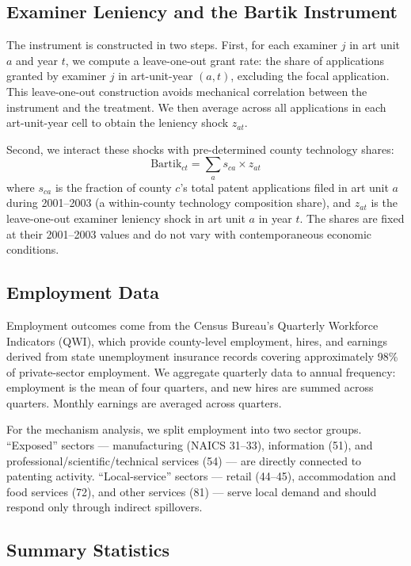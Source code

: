 \documentclass[12pt]{article}
\begin{document}
\subsection{Examiner Leniency and the Bartik Instrument}

The instrument is constructed in two steps. First, for each examiner $j$ in art unit $a$ and year $t$, we compute a leave-one-out grant rate: the share of applications granted by examiner $j$ in art-unit-year $(a,t)$, excluding the focal application. This leave-one-out construction avoids mechanical correlation between the instrument and the treatment. We then average across all applications in each art-unit-year cell to obtain the leniency shock $z_{at}$.

Second, we interact these shocks with pre-determined county technology shares:
\begin{equation}
\text{Bartik}_{ct} = \sum_{a} s_{ca} \times z_{at}
\label{eq:bartik}
\end{equation}
where $s_{ca}$ is the fraction of county $c$'s total patent applications filed in art unit $a$ during 2001--2003 (a within-county technology composition share), and $z_{at}$ is the leave-one-out examiner leniency shock in art unit $a$ in year $t$. The shares are fixed at their 2001--2003 values and do not vary with contemporaneous economic conditions.

\subsection{Employment Data}

Employment outcomes come from the Census Bureau's Quarterly Workforce Indicators (QWI), which provide county-level employment, hires, and earnings derived from state unemployment insurance records covering approximately 98\% of private-sector employment. We aggregate quarterly data to annual frequency: employment is the mean of four quarters, and new hires are summed across quarters. Monthly earnings are averaged across quarters.

For the mechanism analysis, we split employment into two sector groups. ``Exposed'' sectors --- manufacturing (NAICS 31--33), information (51), and professional/scientific/technical services (54) --- are directly connected to patenting activity. ``Local-service'' sectors --- retail (44--45), accommodation and food services (72), and other services (81) --- serve local demand and should respond only through indirect spillovers.

\subsection{Summary Statistics}
\end{document}
